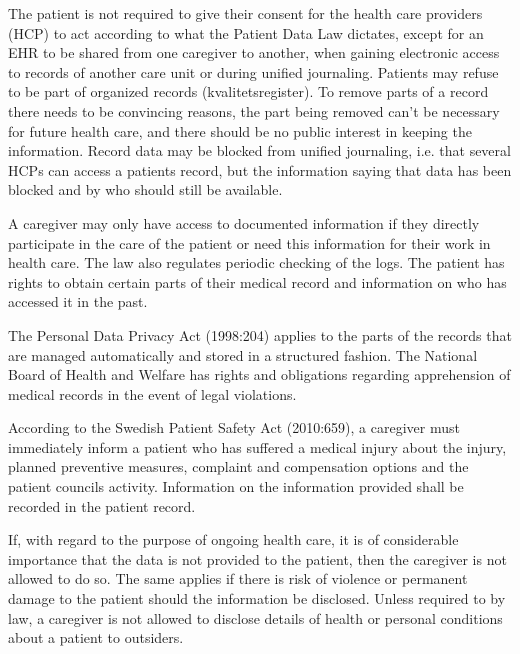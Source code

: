\documentclass[14pt]{article}
\begin{document}
The patient is not required to give their consent for the health care providers (HCP) to act according to what the Patient Data Law dictates, except for an EHR to be shared from one caregiver to another, when gaining electronic access to records of another care unit or during unified journaling. Patients may refuse to be part of organized records (kvalitetsregister). To remove parts of a record there needs to be convincing reasons, the part being removed can't be necessary for future health care, and there should be no public interest in keeping the information. Record data may be blocked from unified journaling, i.e. that several HCPs can access a patients record, but the information saying that data has been blocked and by who should still be available. 

A caregiver may only have access to documented information if they directly participate in the care of the patient or need this information for their work in health care. The law also regulates periodic checking of the logs. The patient has rights to obtain certain parts of their medical record and information on who has accessed it in the past.\cite{PatientDataAct}

The Personal Data Privacy Act (1998:204) applies to the parts of the records that are managed automatically and stored in a structured fashion. The National Board of Health and Welfare has rights and obligations regarding apprehension of medical records in the event of legal violations.\cite{PatientDataAct}

According to the Swedish Patient Safety Act (2010:659), a caregiver must immediately inform a patient who has suffered a medical injury about the injury, planned preventive measures, complaint and compensation
options and the patient councils activity. Information on the information provided shall be recorded in the patient record.\cite{PatientSafetyAct}

If, with regard to the purpose of ongoing health care, it is of considerable importance that the data is not provided to the patient, then the caregiver is not allowed to do so. The same applies if there is risk of violence or permanent damage to the patient should the information be disclosed. Unless required to by law, a caregiver is not allowed to disclose details of health or personal conditions about a patient to outsiders.\cite{PatientSafetyAct}
\end{document}
